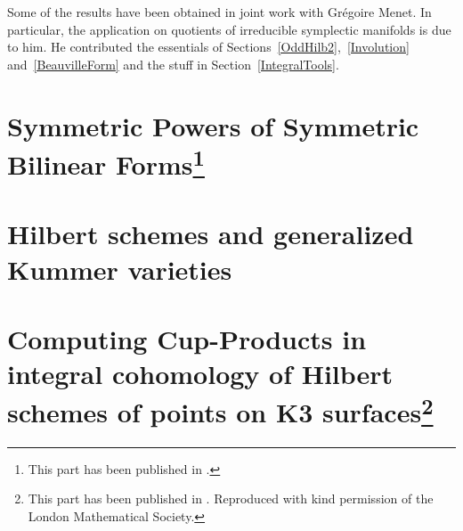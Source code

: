 \documentclass[11pt,twoside]{article}
\begin{document}
Some of the results have been obtained in joint work with Gr\'egoire Menet. In particular, the application on quotients of irreducible symplectic manifolds is due to him.
He contributed the essentials of Sections~\ref{OddHilb2},~\ref{Involution} and~\ref{BeauvilleForm} and the stuff in Section~\ref{IntegralTools}.


\cleardoublepage

\tableofcontents

\cleardoublepage


\pagestyle{fancy}




\newpage
\part[Symmetric Powers of Symmetric Bilinear Forms]{Symmetric Powers of Symmetric Bilinear Forms\protect\footnote{This part has been published in \cite{Kapfer}.}}

\newpage
\part{Hilbert schemes and generalized Kummer varieties}






\label{integralcohomology}





\newpage
\part[Computing Cup-Products in integral cohomology of Hilbert schemes of points on K3 surfaces]{Computing Cup-Products in integral cohomology of Hilbert schemes of points on K3 surfaces\protect\footnote{This part has been published in \cite{Kapfer2}. Reproduced with kind permission of the London Mathematical Society.}}



\appendix

\clearpage

\clearpage

\newpage

\end{document}
